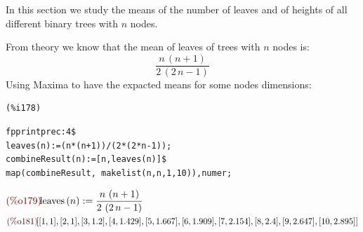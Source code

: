 In this section we study the means of the number of leaves and of
heights of all different binary trees with $n$ nodes.

From theory we know that the mean of leaves of trees with $n$ nodes
is:
\begin{displaymath}
  \frac{n\,\left( n+1\right)  }{2\,\left( 2\,n-1\right) }
\end{displaymath}
Using Maxima to have the expacted means for some nodes dimensions:

\noindent
\begin{minipage}[t]{8ex}{\color{red}\bf
\begin{verbatim}
(%i178) 
\end{verbatim}}
\end{minipage}
\begin{minipage}[t]{\textwidth}{\color{blue}
\begin{verbatim}
fpprintprec:4$
leaves(n):=(n*(n+1))/(2*(2*n-1));
combineResult(n):=[n,leaves(n)]$
map(combineResult, makelist(n,n,1,10)),numer;
\end{verbatim}}
\end{minipage}
\begin{math}\displaystyle
\parbox{8ex}{\color{labelcolor}(\%o179) }
\mathrm{leaves}\left( n\right) :=\frac{n\,\left( n+1\right)
}{2\,\left( 2\,n-1\right) }
\end{math}\\
\begin{math}\displaystyle
\parbox{8ex}{\color{labelcolor}(\%o181) }
[[1,1],[2,1],[3,1.2],[4,1.429],[5,1.667],[6,1.909],[7,2.154],[8,2.4],
[9,2.647],[10,2.895]]
\end{math}\\

